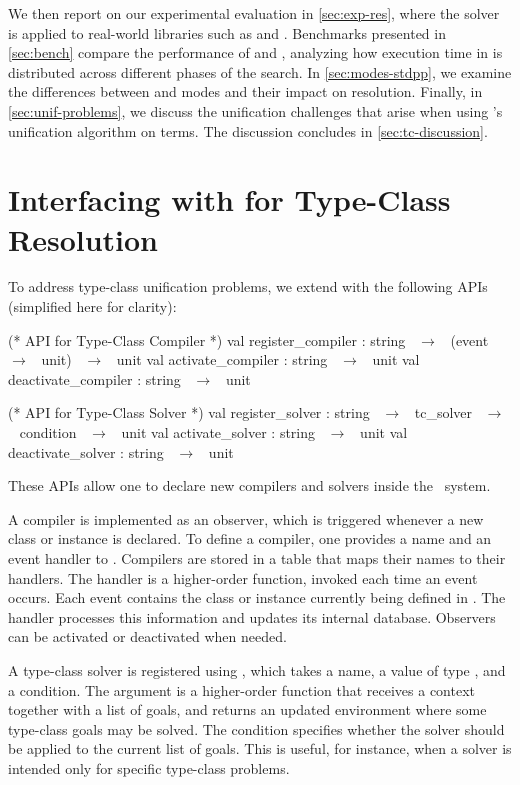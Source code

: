 We then report on our experimental evaluation in \cref{sec:exp-res}, where the
solver is applied to real-world libraries such as \stdpp and \tlc. Benchmarks
presented in \cref{sec:bench} compare the performance of \rocq and \elpi,
analyzing how execution time in \elpi is distributed across different phases of
the search. In \cref{sec:modes-stdpp}, we examine the differences between \elpi
and \rocq modes and their impact on resolution. Finally, in
\cref{sec:unif-problems}, we discuss the unification challenges that arise when
using \elpi's unification algorithm on \rocq terms. The discussion concludes in
\cref{sec:tc-discussion}.

\section{Interfacing \rocq with \elpi for Type-Class Resolution}
\label{sec:interface-rocq-elpi}

To address type-class unification problems, we extend \rocq with the
following APIs (simplified here for clarity):

\begin{camlcode}
(* API for Type-Class Compiler *)
val register_compiler   : string ~$\to$~ (event ~$\to$~ unit) ~$\to$~ unit
val activate_compiler   : string ~$\to$~ unit
val deactivate_compiler : string ~$\to$~ unit

(* API for Type-Class Solver *)
val register_solver   : string ~$\to$~ tc_solver ~$\to$~ condition ~$\to$~ unit
val activate_solver   : string ~$\to$~ unit
val deactivate_solver : string ~$\to$~ unit
\end{camlcode}

These APIs allow one to declare new compilers and solvers inside the
\rocq\ system.

A compiler is implemented as an observer, which is triggered whenever a
new class or instance is declared. To define a compiler, one provides a
name and an event handler to . Compilers are
stored in a table that maps their names to their handlers. The handler is a
higher-order function, invoked each time an event occurs. Each event
contains the class or instance currently being defined in \rocq. The
handler processes this information and updates its internal database.
Observers can be activated or deactivated when needed.

A type-class solver is registered using , which
takes a name, a value of type , and a condition. The
 argument is a higher-order function that receives a \rocq
context together with a list of goals, and returns an updated environment
where some type-class goals may be solved. The condition specifies
whether the solver should be applied to the current list of goals. This
is useful, for instance, when a solver is intended only for specific
type-class problems.

